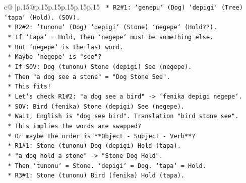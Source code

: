 \documentclass{article}
\begin{document}
{\begin{supertabular}{c@{$\;$}|p{.15\linewidth}@{}p{.15\linewidth}p{.15\linewidth}p{.15\linewidth}p{.15\linewidth}p{.15\linewidth}}
{{{\texttt{                                                *   R2\#1: `genepu` (Dog) `depigi` (Tree) `tapa` (Hold). (SOV).} \\
\texttt{                                                *   R2\#2: `tunonu` (Dog) `depigi` (Stone) `negepe` (Hold??).} \\
\texttt{                                                    *   If `tapa` = Hold, then `negepe` must be something else.} \\
\texttt{                                                    *   But `negepe` is the last word.} \\
\texttt{                                                    *   Maybe `negepe` is "see"?} \\
\texttt{                                                    *   If SOV: Dog (tunonu) Stone (depigi) See (negepe).} \\
\texttt{                                                    *   Then "a dog see a stone" = "Dog Stone See".} \\
\texttt{                                                    *   This fits!} \\
\texttt{                                                    *   Let's check R1\#2: "a dog see a bird" {-}> `fenika depigi negepe`.} \\
\texttt{                                                        *   SOV: Bird (fenika) Stone (depigi) See (negepe).} \\
\texttt{                                                        *   Wait, English is "dog see bird". Translation "bird stone see".} \\
\texttt{                                                        *   This implies the words are swapped?} \\
\texttt{                                                        *   Or maybe the order is **Object {-} Subject {-} Verb**?} \\
\texttt{                                                            *   R1\#1: Stone (tunonu) Dog (depigi) Hold (tapa).} \\
\texttt{                                                                *   "a dog hold a stone" {-}> "Stone Dog Hold".} \\
\texttt{                                                                *   Then `tunonu` = Stone. `depigi` = Dog. `tapa` = Hold.} \\
\texttt{                                                            *   R3\#1: Stone (tunonu) Bird (fenika) Hold (tapa).} \\
}}}
\end{supertabular}}
\end{document}
